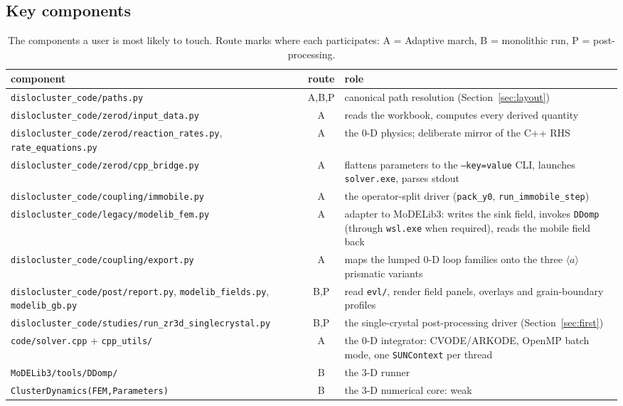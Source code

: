 \documentclass[11pt]{article}
\newcommand{\aloop}{\ensuremath{\langle a\rangle}}
\newcommand{\MoD}{\textsf{MoDELib3}}
\newcommand{\code}[1]{\texttt{\small #1}}
\newcommand{\file}[1]{\texttt{\footnotesize #1}}
\begin{document}
\subsection{Key components}

\begin{table}[htbp]
\centering
\caption{The components a user is most likely to touch. Route marks where
each participates: A = Adaptive march, B = monolithic run, P =
post-processing.}
\label{tab:components}
\begin{tabular}{@{}p{}cp{}@{}}
\toprule
component & route & role \\
\midrule
\file{dislocluster\_code/paths.py} & A,B,P & canonical path resolution
(Section~\ref{sec:layout}) \\
\file{dislocluster\_code/zerod/input\_data.py} & A & reads the workbook, computes every
derived quantity \\
\file{dislocluster\_code/zerod/reaction\_rates.py}, \file{rate\_equations.py} & A & the
0-D physics; deliberate mirror of the C++ RHS \\
\file{dislocluster\_code/zerod/cpp\_bridge.py} & A & flattens parameters to the
\code{--key=value} CLI, launches \file{solver.exe}, parses stdout \\
\file{dislocluster\_code/coupling/immobile.py} & A & the operator-split driver
(\code{pack\_y0}, \code{run\_immobile\_step}) \\
\file{dislocluster\_code/legacy/modelib\_fem.py} & A & adapter to \MoD{}: writes the sink
field, invokes \code{DDomp} (through \code{wsl.exe} when required), reads
the mobile field back \\
\file{dislocluster\_code/coupling/export.py} & A & maps the lumped 0-D loop families
onto the three \aloop{} prismatic variants \\
\file{dislocluster\_code/post/report.py}, \file{modelib\_fields.py},
\file{modelib\_gb.py} & B,P & read \file{evl/}, render field panels,
overlays and grain-boundary profiles \\
\file{dislocluster\_code/studies/run\_zr3d\_singlecrystal.py} & B,P & the single-crystal
post-processing driver (Section~\ref{sec:first}) \\
\file{code/solver.cpp} + \file{cpp\_utils/} & A & the 0-D integrator:
CVODE/ARKODE, OpenMP batch mode, one \code{SUNContext} per thread \\
\file{MoDELib3/tools/DDomp/} & B & the 3-D runner \\
\file{ClusterDynamics(FEM,Parameters)} & B & the 3-D numerical core: weak

\end{tabular}
\end{table}
\end{document}
